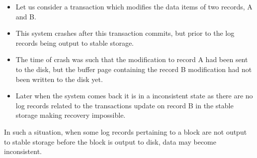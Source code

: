 \documentclass[12pt]{article}
\begin{document}
\begin{itemize}
    \item Let us consider a transaction which modifies the data items of two records, A and B.
    \item This system crashes after this transaction commits, but prior to the log records being output to stable storage.
    \item The time of crash was such that the modification to record A had been sent to the disk, but the buffer page containing the record B modification had not been written to the disk yet.
    \item Later when the system comes back it is in a inconsistent state as there are no log records related to the transactions update on record B in the stable storage making recovery impossible.
\end{itemize}
In such a situation, when some log records pertaining to a block are not output to stable storage before the block is output to disk, data may become inconsistent. 
\end{document}
